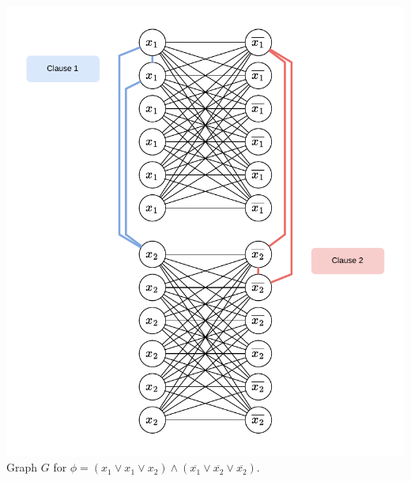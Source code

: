 \documentclass[11pt]{article}
\begin{document}
\begin{center}
\includegraphics[scale=1.0]{Figures/Problem7.27a.pdf} \\
Graph $G$ for $\phi = (x_1 \vee x_1 \vee x_2) \wedge (\overline{x_1} \vee \overline{x_2} \vee \overline{x_2})$.
\end{center}
\end{document}
